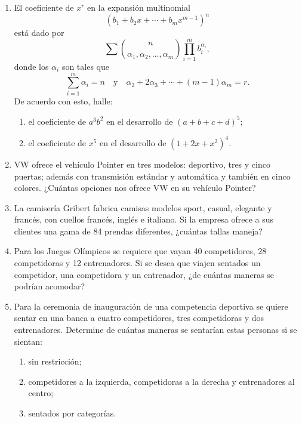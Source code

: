 \begin{Ejer}
\begin{enumerate}

\item El coeficiente de $x^r$ en la expansi\'on multinomial
\[
(b_1+b_2x+\cdots+b_mx^{m-1})^n
\]
est\'a dado por
\[
\sum \binom{n}{\alpha_1,\alpha_2,\ldots,\alpha_m}\prod_{i=1}^m b_i^{\alpha_i},
\]
donde los $\alpha_i$ son tales que
\[
\sum_{i=1}^m \alpha_i=n
\quad\text{y}\quad
\alpha_2+2\alpha_3+\cdots+(m-1)\alpha_m=r.
\]
De acuerdo con esto, halle:
\begin{enumerate}
\item el coeficiente de $a^3b^2$ en el desarrollo de $(a+b+c+d)^5$;
\item el coeficiente de $x^5$ en el desarrollo de $(1+2x+x^2)^4$.
\end{enumerate}

\item VW ofrece el veh\'iculo Pointer en tres modelos: deportivo, tres y cinco puertas; adem\'as con transmisi\'on est\'andar y autom\'atica y tambi\'en en cinco colores. ¿Cu\'antas opciones nos ofrece VW en su veh\'iculo Pointer?

\item La camiser\'ia Gribert fabrica camisas modelos sport, casual, elegante y franc\'es, con cuellos franc\'es, ingl\'es e italiano. Si la empresa ofrece a sus clientes una gama de 84 prendas diferentes, ¿cu\'antas tallas maneja?

\item Para los Juegos Ol\'impicos se requiere que vayan 40 competidores, 28 competidoras y 12 entrenadores. Si se desea que viajen sentados un competidor, una competidora y un entrenador, ¿de cu\'antas maneras se podr\'ian acomodar?

\item Para la ceremonia de inauguraci\'on de una competencia deportiva se quiere sentar en una banca a cuatro competidores, tres competidoras y dos entrenadores. Determine de cu\'antas maneras se sentar\'ian estas personas si se sientan:
\begin{enumerate}
\item sin restricci\'on;
\item competidores a la izquierda, competidoras a la derecha y entrenadores al centro;
\item sentados por categor\'ias.
\end{enumerate}

\end{enumerate}
\end{Ejer}


